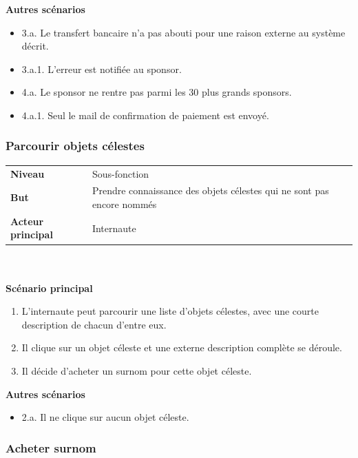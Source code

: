 \documentclass[11pt,a4paper]{article}
\begin{document}
\textbf{Autres scénarios}

\begin{itemize}[label=]
    \item 3.a. Le transfert bancaire n’a pas abouti pour une raison externe au système décrit.
    \item 3.a.1. L’erreur est notifiée au sponsor.
    \item 4.a.  Le sponsor ne rentre pas parmi les 30 plus grands sponsors.
    \item 4.a.1. Seul le mail de confirmation de paiement est envoyé.
\end{itemize}


\subsubsection{Parcourir objets célestes}

\begin{tabular}{ll}
    \textbf{Niveau} & Sous-fonction \\
    \textbf{But} & Prendre connaissance des objets célestes qui ne sont pas encore nommés \\
    \textbf{Acteur principal} & Internaute \newline
\end{tabular}
~\\
~\\

\textbf{Scénario principal}

\begin{enumerate}
    \item L’internaute peut parcourir une liste d’objets célestes, avec une courte description de chacun d’entre eux.
    \item Il clique sur un objet céleste et une externe description complète se déroule.
    \item Il décide d'acheter un surnom pour cette objet céleste.
\end{enumerate}

\textbf{Autres scénarios}

\begin{itemize}[label=]
    \item 2.a. Il ne clique sur aucun objet céleste.
\end{itemize}



\subsubsection{Acheter surnom}
\end{document}
